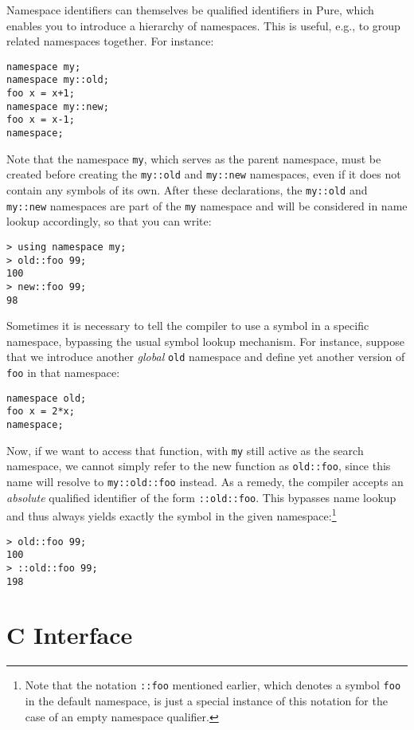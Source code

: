 \documentclass[a4paper,12pt]{article}
\begin{document}
Namespace identifiers can themselves be qualified identifiers in Pure, which enables you to introduce a hierarchy of namespaces. This is useful, e.g., to group related namespaces together. For instance:

\begin{lstlisting}
namespace my;
namespace my::old;
foo x = x+1;
namespace my::new;
foo x = x-1;
namespace;
\end{lstlisting}

Note that the namespace \verb|my|, which serves as the parent namespace, must be created before creating the \verb|my::old| and \verb|my::new| namespaces, even if it does not contain any symbols of its own. After these declarations, the \verb|my::old| and \verb|my::new| namespaces are part of the \verb|my| namespace and will be considered in name lookup accordingly, so that you can write:

\begin{lstlisting}
> using namespace my;
> old::foo 99;
100
> new::foo 99;
98
\end{lstlisting}

Sometimes it is necessary to tell the compiler to use a symbol in a specific namespace, bypassing the usual symbol lookup mechanism. For instance, suppose that we introduce another \emph{global} \verb|old| namespace and define yet another version of \verb|foo| in that namespace:

\begin{lstlisting}
namespace old;
foo x = 2*x;
namespace;
\end{lstlisting}

Now, if we want to access that function, with \verb|my| still active as the search namespace, we cannot simply refer to the new function as \verb|old::foo|, since this name will resolve to \verb|my::old::foo| instead. As a remedy, the compiler accepts an \emph{absolute} qualified identifier of the form \verb|::old::foo|. This bypasses name lookup and thus always yields exactly the symbol in the given namespace:\footnote{Note that the notation \texttt{::foo} mentioned earlier, which denotes a symbol \texttt{foo} in the default namespace, is just a special instance of this notation for the case of an empty namespace qualifier.}

\begin{lstlisting}
> old::foo 99;
100
> ::old::foo 99;
198
\end{lstlisting}

\section{C Interface}
\label{C Interface}
\end{document}
